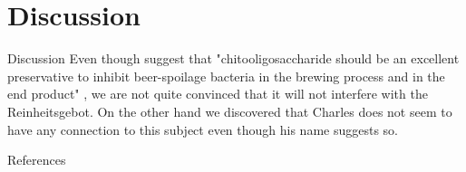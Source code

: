\documentclass[10pt]{beamer}
\begin{document}
\section{Discussion}
\begin{frame}{Discussion}
Even though \cite{Zhao2015} suggest that "chitooligosaccharide should be an excellent preservative to inhibit beer-spoilage bacteria in the brewing process and in the end product" , we are not quite convinced that it will not interfere with the Reinheitsgebot. On the other hand we discovered that Charles \cite{Beer2003} does not seem to have any connection to this subject even though his name suggests so.
\end{frame} 


\begin{frame}[allowframebreaks]{References}

\printbibliography

\end{frame}
\end{document}
